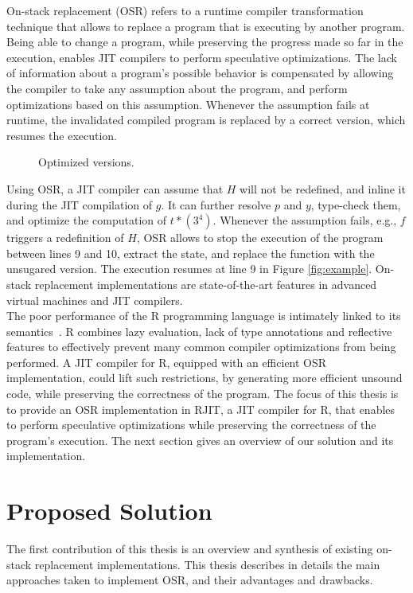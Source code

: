 On-stack replacement (OSR) refers to a runtime compiler transformation technique that allows to replace a program that is executing by another program.
Being able to change a program, while preserving the progress made so far in the execution, enables JIT compilers to perform speculative optimizations.
The lack of information about a program’s possible behavior is compensated by allowing the compiler to take any assumption about the program, and perform optimizations based on this assumption.
Whenever the assumption fails at runtime, the invalidated compiled program is replaced by a correct version, which resumes the execution.\\

\begin{wrapfigure}[13]{l}{6.5cm}
\caption{Optimized versions.}
\end{wrapfigure}
Using OSR, a JIT compiler can assume that $H$ will not be redefined, and inline it during the JIT compilation of $g$.
It can further resolve $p$ and $y$, type-check them, and optimize the computation of $t * (3 ^ 4)$.
Whenever the assumption fails, e.g., $f$ triggers a redefinition of $H$, OSR allows to stop the execution of the program between lines 9 and 10, extract the state, and replace the function with the unsugared version.
The execution resumes at line 9 in Figure \ref{fig:example}.
On-stack replacement implementations are state-of-the-art features in advanced virtual machines and JIT compilers.\\

The poor performance of the R programming language is intimately linked to its semantics~\cite{morandat2012evaluating}. R combines lazy evaluation, lack of type annotations and reflective features to effectively prevent many common compiler optimizations from being performed.
A JIT compiler for R, equipped with an efficient OSR implementation, could lift such restrictions, by generating more efficient unsound code, while preserving the correctness of the program.
The focus of this thesis is to provide an OSR implementation in RJIT, a JIT compiler for R, that enables to perform speculative optimizations while preserving the correctness of the program's execution.
The next section gives an overview of our solution and its implementation.\\

\section{Proposed Solution}
The first contribution of this thesis is an overview and synthesis of existing on-stack replacement implementations.
This thesis describes in details the main approaches taken to implement OSR, and their advantages and drawbacks.\\

